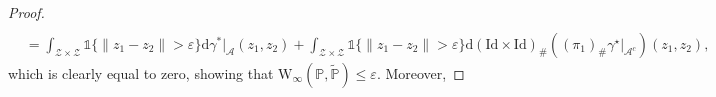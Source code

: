 \documentclass[11pt,a4paper]{article}
\begin{document}
\begin{proof}
\begin{align*}
    \\& = \int_{\mathcal Z \times \mathcal Z} \mathds{1}\{\|z_1 - z_2\| > \varepsilon\} \mathrm{d} \gamma^*|_\mathcal{A}(z_1,z_2) + \int_{\mathcal Z \times \mathcal Z} \mathds{1}\{\|z_1 - z_2\| > \varepsilon\} \mathrm{d} (\text{Id} \times \text{Id})_\# \left((\pi_1)_\# \gamma^\star|_{\mathcal A^c}\right)(z_1,z_2),
\end{align*}
which is clearly equal to zero, showing that $\text{W}_\infty(\mathbb P, \widetilde{\mathbb P})\leq \varepsilon$. Moreover,


\end{proof}
\end{document}
